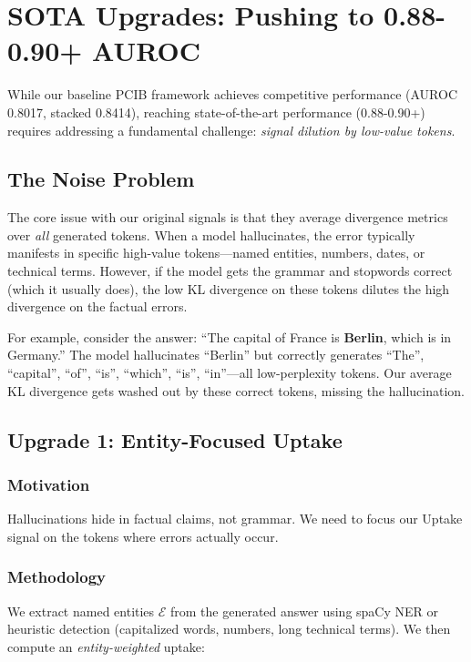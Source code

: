 \section{SOTA Upgrades: Pushing to 0.88-0.90+ AUROC}
\label{sec:sota}

While our baseline PCIB framework achieves competitive performance (AUROC 0.8017, stacked 0.8414), reaching state-of-the-art performance (0.88-0.90+) requires addressing a fundamental challenge: \textit{signal dilution by low-value tokens}.

\subsection{The Noise Problem}

The core issue with our original signals is that they average divergence metrics over \textit{all} generated tokens. When a model hallucinates, the error typically manifests in specific high-value tokens—named entities, numbers, dates, or technical terms. However, if the model gets the grammar and stopwords correct (which it usually does), the low KL divergence on these tokens dilutes the high divergence on the factual errors.

For example, consider the answer: ``The capital of France is \textbf{Berlin}, which is in Germany.'' The model hallucinates ``Berlin'' but correctly generates ``The'', ``capital'', ``of'', ``is'', ``which'', ``is'', ``in''—all low-perplexity tokens. Our average KL divergence gets washed out by these correct tokens, missing the hallucination.

\subsection{Upgrade 1: Entity-Focused Uptake}

\subsubsection{Motivation}
Hallucinations hide in factual claims, not grammar. We need to focus our Uptake signal on the tokens where errors actually occur.

\subsubsection{Methodology}
We extract named entities $\mathcal{E}$ from the generated answer using spaCy NER or heuristic detection (capitalized words, numbers, long technical terms). We then compute an \textit{entity-weighted} uptake:

